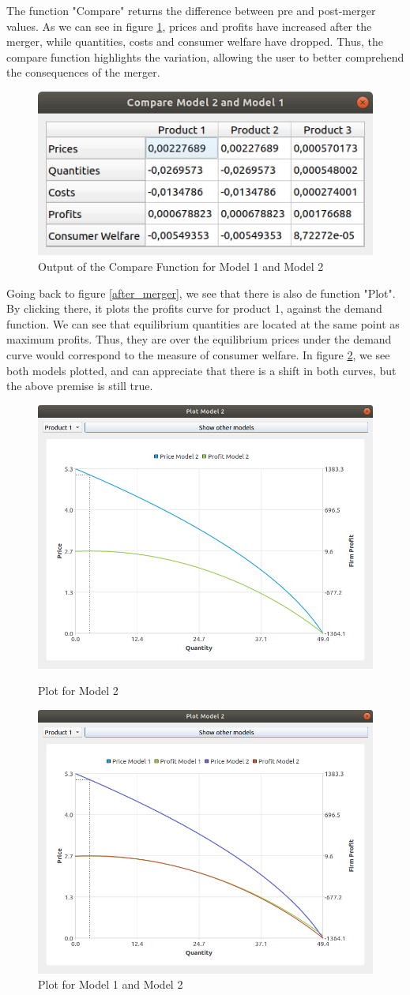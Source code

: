 \documentclass[12pt]{article}
\begin{document}
The function "Compare" returns the difference between pre and post-merger values. As we can see in figure \ref{compare}, prices and profits have increased after the merger, while quantities, costs and consumer welfare have dropped. Thus, the compare function highlights the variation, allowing the user to better comprehend the consequences of the merger. 
\begin{figure}[H]
\begin{center}
  \includegraphics[width=10 cm]{compare}
\caption{\label{compare} Output of the Compare Function for Model 1 and Model 2}
\end{center}
\end{figure}

Going back to figure \ref{after_merger}, we see that there is also de function "Plot". By clicking there, it plots the profits curve for product 1, against the demand function. We can see that equilibrium quantities are located at the same point as maximum profits. Thus, they are over the equilibrium prices under the demand curve would correspond to the measure of consumer welfare. In figure \ref{plot_2}, we see both models plotted, and can appreciate that there is a shift in both curves, but the above premise is still true. 
\begin{figure}[H]
\begin{center}
\begin{minipage}{2.75in}
  \includegraphics[width=5 cm]{plot_1}
\caption{\label{plot_1} Plot for Model 2}
\end{minipage}
\begin{minipage}{2.75in}
 \includegraphics[width=5 cm]{plot_2}
\caption{\label{plot_2} Plot for Model 1 and Model 2}
\end{minipage}
\end{center}
\end{figure}
\end{document}
